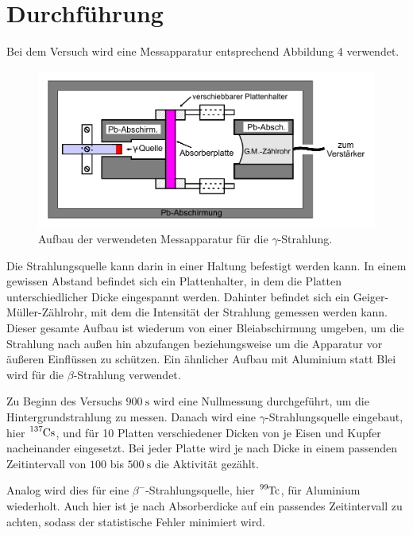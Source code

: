 \section{Durchführung}
\label{sec:Durchführung}

Bei dem Versuch wird eine Messapparatur entsprechend Abbildung 4 verwendet. 
\begin{figure}
    \centering
    \includegraphics[width=\linewidth]{pictures/messaparatur.pdf}
    \caption{Aufbau der verwendeten Messapparatur für die $\gamma$-Strahlung. \cite{v704}}
    \label{fig:messaparatur}
\end{figure}

Die Strahlungsquelle kann darin in einer Haltung befestigt werden kann. 
In einem gewissen Abstand befindet sich ein Plattenhalter, in dem die Platten unterschiedlicher Dicke eingespannt werden. 
Dahinter befindet sich ein Geiger-Müller-Zählrohr, mit dem die Intensität der Strahlung gemessen werden kann. 
Dieser gesamte Aufbau ist wiederum von einer Bleiabschirmung umgeben, 
um die Strahlung nach außen hin abzufangen beziehungsweise um die Apparatur vor äußeren Einflüssen zu schützen.
Ein ähnlicher Aufbau mit Aluminium statt Blei wird für die $\beta$-Strahlung verwendet.

Zu Beginn des Versuchs $\qty{900}{\second}$ wird eine Nullmessung durchgeführt, um die Hintergrundstrahlung zu messen.
Danach wird eine $\gamma$-Strahlungsquelle eingebaut, hier $\ce{^{137}Cs}$,
und für 10 Platten verschiedener Dicken von je Eisen und Kupfer nacheinander eingesetzt.
Bei jeder Platte wird je nach Dicke in einem passenden Zeitintervall von $100$ bis $\qty{500}{\second}$ die Aktivität gezählt.

Analog wird dies für eine $\beta^-$-Strahlungsquelle, hier $\ce{^{99}Tc}$, für Aluminium wiederholt.
Auch hier ist je nach Absorberdicke auf ein passendes Zeitintervall zu achten, 
sodass der statistische Fehler minimiert wird.